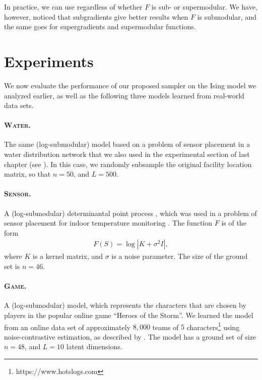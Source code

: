 
In practice, we can use  regardless of whether $F$ is sub- or supermodular.
We have, however, noticed that subgradients give better results when $F$ is submodular, and the same goes for supergradients and supermodular functions.


\section{Experiments}
We now evaluate the performance of our proposed sampler on the Ising model we analyzed earlier, as well as the following three models learned from real-world data sets.
\paragraph{\textsc{Water}.} The same (log-submodular) \flid{} model based on a problem of sensor placement in a water distribution network \citep{krause08} that we also used in the experimental section of last chapter (see ).
In this case, we randomly subsample the original facility location matrix, so that $n = 50$, and $L = 500$.

\paragraph{\textsc{Sensor}.} A (log-submodular) determinantal point process \citep{kulesza12}, which was used in a problem of sensor placement for indoor temperature monitoring \citep{guestrin05}.
The function $F$ is of the form
\begin{align*}
F(S) = \log |K + \sigma^2 I|,
\end{align*}
where $K$ is a kernel matrix, and $\sigma$ is a noise parameter.
The size of the ground set is $n = 46$.

\paragraph{\textsc{Game}.} A (log-submodular) \flid{} model, which represents the characters that are chosen by players in the popular online game ``Heroes of the Storm''.
We learned the model from an online data set of approximately $8,000$ teams of $5$ characters\footnote{https://www.hotslogs.com} using noise-contrastive estimation, as described by \cite{tschiatschek16}.
The model has a ground set of size $n = 48$, and $L = 10$ latent dimensions.

